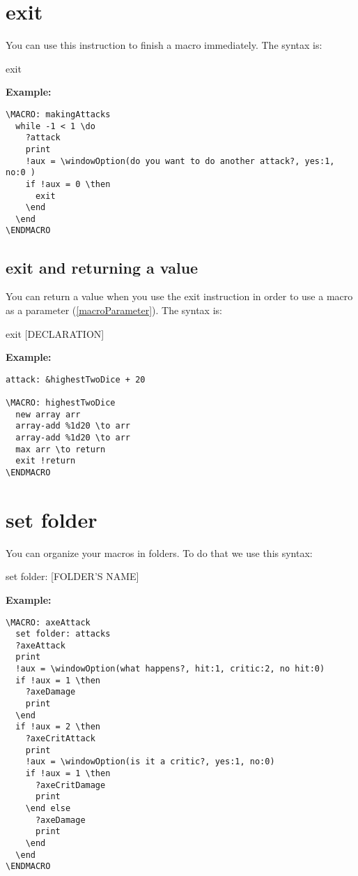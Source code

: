 \documentclass[11pt,a4paper,openright,oneside]{book}
\newenvironment{ex}
{
  \setlength{\parindent}{0cm}
  \large \textbf{Example:} \normalsize 
}
{}
\begin{document}
\section{\textsf{exit}}

You can use this instruction to finish a macro immediately. The syntax is:
\begin{center} \textsf{exit} \end{center}

\begin{ex}
  \begin{lstlisting}
\MACRO: makingAttacks
  while -1 < 1 \do
    ?attack
    print
    !aux = \windowOption(do you want to do another attack?, yes:1, no:0 )
    if !aux = 0 \then
      exit
    \end
  \end
\ENDMACRO
  \end{lstlisting}
\end{ex}

\subsection{\textsf{exit} and returning a value} \label{exitInstructionReturningValue}

You can return a value when you use the \textsf{exit} instruction in order to use a macro as a parameter (\ref{macroParameter}). The syntax is:
\begin{center} \textsf{exit \textsc{\scriptsize [DECLARATION]}} \end{center}

\begin{ex} 
  \begin{lstlisting}
attack: &highestTwoDice + 20

\MACRO: highestTwoDice
  new array arr
  array-add %1d20 \to arr
  array-add %1d20 \to arr
  max arr \to return
  exit !return
\ENDMACRO
  \end{lstlisting}
\end{ex}

\section{\textsf{set folder}}

You can organize your macros in folders. To do that we use this syntax:
\begin{center} \textsf{set folder: \textsc{\scriptsize [FOLDER'S NAME]}} \end{center}

\begin{ex}
  \begin{lstlisting}
\MACRO: axeAttack
  set folder: attacks
  ?axeAttack
  print
  !aux = \windowOption(what happens?, hit:1, critic:2, no hit:0)
  if !aux = 1 \then
    ?axeDamage
    print
  \end
  if !aux = 2 \then
    ?axeCritAttack
    print
    !aux = \windowOption(is it a critic?, yes:1, no:0)
    if !aux = 1 \then
      ?axeCritDamage
      print
    \end else
      ?axeDamage
      print
    \end
  \end
\ENDMACRO
  \end{lstlisting}
\end{ex}
\end{document}
